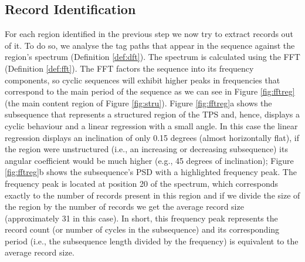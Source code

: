 \vspace{-0.3cm}

\subsection{Record Identification}\label{ss:reci}

For each region identified in the previous step we now try to extract records
out of it. To do so, we analyse the tag paths that appear in the sequence
against the region's spectrum (Definition \ref{def:dft}). The spectrum is
calculated using the FFT\cite{fft1965} (Definition \ref{def:fft}).
The FFT factors the sequence into its frequency components, so
cyclic sequences will exhibit higher peaks in frequencies that correspond to the
main period of the sequence as we can see in Figure \ref{fig:fftreg} (the main
content region of Figure \ref{fig:stru}). Figure \ref{fig:fftreg}a shows the
subsequence that represents a structured region of the TPS and, hence, displays
a cyclic behaviour and a linear regression with a small angle. In this case the
linear regression displays an inclination of only 0.15 degrees (almost
horizontally flat), if the region were unstructured (i.e., an increasing or
decreasing subsequence) its angular coefficient would be much higher (e.g., 45
degrees of inclination); Figure \ref{fig:fftreg}b shows the subsequence's PSD
with a highlighted frequency peak. The frequency peak is located at position 20
of the spectrum, which corresponds exactly to the number of records present in
this region and if we divide the size of the region by the number of records we
get the average record size (approximately 31 in this case).
In short, this frequency peak represents the record count (or number of cycles
in the subsequence) and its corresponding period (i.e., the subsequence length
divided by the frequency) is equivalent to the average record size.

\vspace{-0.3cm}

